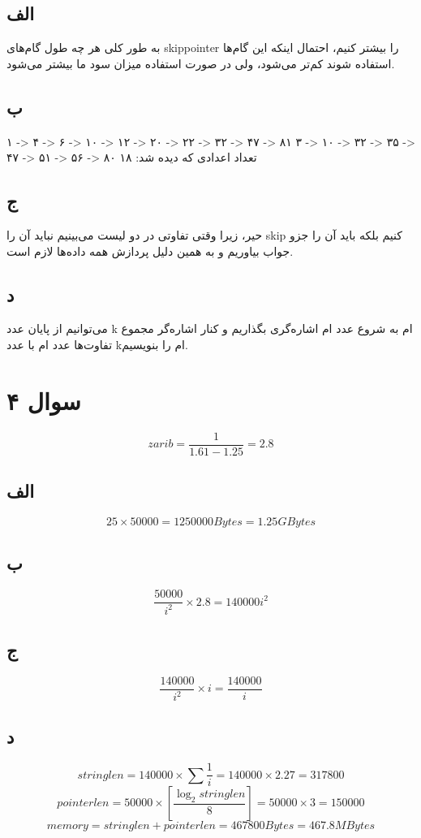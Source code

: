 \documentclass[11pt]{article}
\begin{document}
\subsection{الف}
به طور کلی هر چه طول گام‌های skippointer را بیشتر کنیم، احتمال اینکه این گام‌ها استفاده شوند کم‌تر می‌شود، ولی در صورت استفاده میزان سود ما بیشتر می‌شود. 
\subsection{ب}
۱ -> ۴ -> ۶ -> ۱۰ -> ۱۲ -> ۲۰ -> ۲۲ -> ۳۲ -> ۴۷ -> ۸۱ 
\newline
۳ -> ۱۰ -> ۳۲ ->‌ ۳۵ -> ۴۷ -> ۵۱ -> ۵۶ -> ۸۰
\newline
تعداد اعدادی که دیده شد: ۱۸
\subsection{ج}
حیر، زیرا وقتی تفاوتی در دو لیست می‌بینیم نباید آن را skip کنیم بلکه باید آن را جزو جواب بیاوریم و به همین دلیل پردازش همه داده‌ها لازم است.
\subsection{د}
می‌توانیم از پایان عدد k ام به شروع عدد
ام اشاره‌گری بگذاریم و کنار اشاره‌گر مجموع تفاوت‌ها عدد
ام با عدد kام را بنویسیم.
\section{سوال ۴}
$$ zarib = \frac{1}{1.61 - 1.25} = 2.8 $$
\subsection{الف}
$$ 25 \times 50000 = 1250000 Bytes = 1.25 GBytes$$
\subsection{ب}
$$ \frac{50000}{i^2} \times 2.8 = {140000}{i^2} $$
\subsection{ج}
$$ \frac{140000}{i^2} \times i = \frac{140000}{i}$$
\subsection{د}
$$ stringlen = 140000 \times \sum \frac{1}{i} = 140000 \times 2.27 = 317800$$
$$ pointerlen = 50000 \times [\frac{\log _2 stringlen}{8}] = 50000 \times 3 = 150000 $$
$$ memory = stringlen + pointerlen = 467800 Bytes = 467.8 MBytes $$
\end{document}
